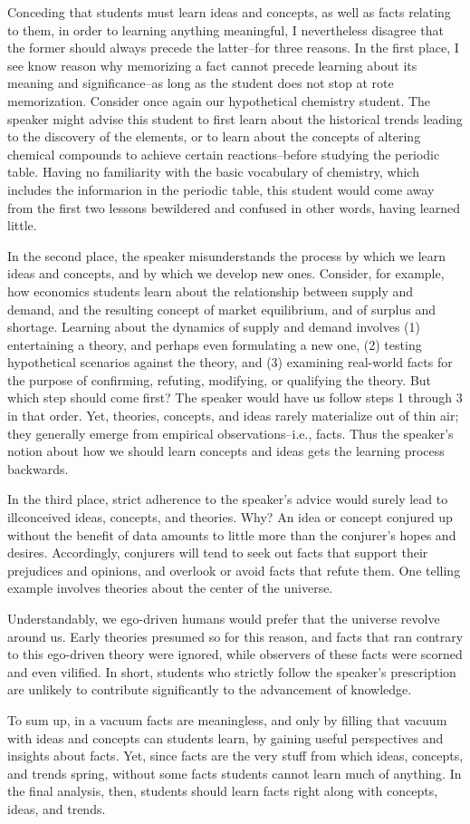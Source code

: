 Conceding that students must learn ideas and concepts, as well as facts relating to them, in order to learning anything meaningful, I nevertheless disagree that the former should always precede the latter--for three reasons.
In the first place, I see know reason why memorizing a fact cannot precede learning about its meaning and significance--as long as the student does not stop at rote memorization.
Consider once again our hypothetical chemistry student.
The speaker might advise this student to first learn about the historical trends leading to the discovery of the elements, or to learn about the concepts of altering chemical compounds to achieve certain reactions--before studying the periodic table.
Having no familiarity with the basic vocabulary of chemistry, which includes the informarion in the periodic table, this student would come away from the first two lessons bewildered and confused in other words, having learned little.


In the second place, the speaker misunderstands the process by which we learn ideas and concepts, and by which we develop new ones.
Consider, for example, how economics students learn about the relationship between supply and demand, and the resulting concept of market equilibrium, and of surplus and shortage.
Learning about the dynamics of supply and demand involves (1) entertaining a theory, and perhaps even formulating a new one, (2) testing hypothetical scenarios against the theory, and (3) examining real-world facts for the purpose of confirming, refuting, modifying, or qualifying the theory.
But which step should come first? The speaker would have us follow steps 1 through 3 in that order.
Yet, theories, concepts, and ideas rarely materialize out of thin air; they generally emerge from empirical observations--i.e., facts.
Thus the speaker's notion about how we should learn concepts and ideas gets the learning process backwards.


In the third place, strict adherence to the speaker's advice would surely lead to illconceived ideas, concepts, and theories.
Why? An idea or concept conjured up without the benefit of data amounts to little more than the conjurer's hopes and desires.
Accordingly, conjurers will tend to seek out facts that support their prejudices and opinions, and overlook or avoid facts that refute them.
One telling example involves theories about the center of the universe.


Understandably, we ego-driven humans would prefer that the universe revolve around us.
Early theories presumed so for this reason, and facts that ran contrary to this ego-driven theory were ignored, while observers of these facts were scorned and even vilified.
In short, students who strictly follow the speaker's prescription are unlikely to contribute significantly to the advancement of knowledge.


To sum up, in a vacuum facts are meaningless, and only by filling that vacuum with ideas and concepts can students learn, by gaining useful perspectives and insights about facts.
Yet, since facts are the very stuff from which ideas, concepts, and trends spring, without some facts students cannot learn much of anything.
In the final analysis, then, students should learn facts right along with concepts, ideas, and trends.
